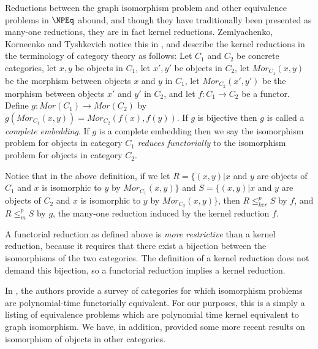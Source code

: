 \documentclass{amsart}
\theoremstyle{definition} \newtheorem{definition}[definition]{Definition}
\newcommand{\kr}{\leq^{p}_{ker}} %
\newcommand{\mor}{\leq^{p}_{m}} %
\newcommand{\defn}[1]{\emph{#1}} %
\begin{document}
Reductions between the graph isomorphism problem and other equivalence problems
in $\NPEq$ abound, and though they have traditionally been presented as
many-one reductions, they are in fact kernel reductions. Zemlyachenko,
Korneenko and Tyshkevich notice this in \cite{zkt85}, and describe the kernel
reductions in the terminology of category theory as follows: Let $C_1$ and
$C_2$ be concrete categories, let $x,y$ be objects in $C_1$, let $x', y'$ be
objects in $C_2$, let $Mor_{C_1}(x,y)$ be the morphism between objects $x$ and
$y$ in $C_1$, let $Mor_{C_2}(x',y')$ be the morphism between objects $x'$ and
$y'$ in $C_2$, and let $f\colon C_1\to C_2$ be a functor. Define $g\colon
Mor(C_1)\to Mor(C_2)$ by $g(Mor_{C_1}(x,y))=Mor_{C_2}(f(x), f(y))$. If $g$ is
bijective then $g$ is called a \defn{complete embedding}. If $g$ is a complete
embedding then we say the isomorphism problem for objects in category $C_1$
\defn{reduces functorially} to the isomorphism problem for objects in category
$C_2$.

Notice that in the above definition, if we let $R=\{(x,y)| x$ and $y$ are
objects of $C_1$ and $x$ is isomorphic to $y$ by $Mor_{C_1}(x,y)\}$ and
$S=\{(x,y)| x$ and $y$ are objects of $C_2$ and $x$ is isomorphic to $y$ by
$Mor_{C_2}(x,y)\}$, then $R\kr S$ by $f$, and $R\mor S$ by $g$, the many-one
reduction induced by the kernel reduction $f$.

A functorial reduction as defined above is \emph{more restrictive} than a
kernel reduction, because it requires that there exist a bijection between the
isomorphisms of the two categories. The definition of a kernel reduction does
not demand this bijection, so a functorial reduction implies a kernel
reduction.

In \cite{zkt85}, the authors provide a survey of categories for which
isomorphism problems are polynomial-time functorially equivalent. For our
purposes, this is a simply a listing of equivalence problems which are
polynomial time kernel equivalent to graph isomorphism. We have, in addition,
provided some more recent results on isomorphism of objects in other
categories.
\end{document}
